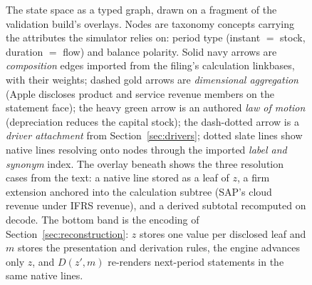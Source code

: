\documentclass[11pt]{article}
\begin{document}
\begin{figure}[h]
\caption{The state space as a typed graph, drawn on a fragment of the validation build's overlays. Nodes are taxonomy concepts carrying the attributes the simulator relies on: period type (instant $=$ stock, duration $=$ flow) and balance polarity. Solid navy arrows are \emph{composition} edges imported from the filing's calculation linkbases, with their weights; dashed gold arrows are \emph{dimensional aggregation} (Apple discloses product and service revenue members on the statement face); the heavy green arrow is an authored \emph{law of motion} (depreciation reduces the capital stock); the dash-dotted arrow is a \emph{driver attachment} from Section~\ref{sec:drivers}; dotted slate lines show native lines resolving onto nodes through the imported \emph{label and synonym} index. The overlay beneath shows the three resolution cases from the text: a native line stored as a leaf of $z$, a firm extension anchored into the calculation subtree (SAP's cloud revenue under IFRS revenue), and a derived subtotal recomputed on decode. The bottom band is the encoding of Section~\ref{sec:reconstruction}: $z$ stores one value per disclosed leaf and $m$ stores the presentation and derivation rules, the engine advances only $z$, and $D(z', m)$ re-renders next-period statements in the same native lines.}
\label{fig:kg}
\end{figure}
\end{document}
